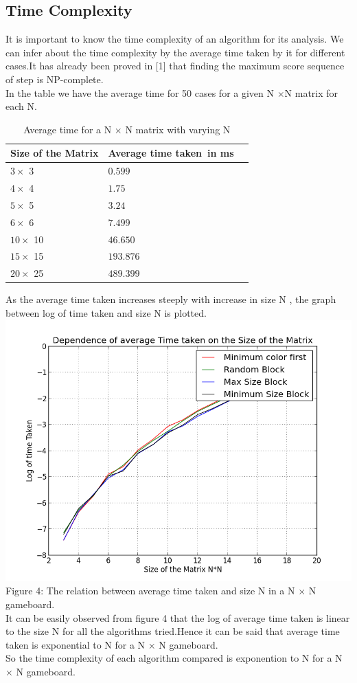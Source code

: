 \documentclass[twoside]{article}
\begin{document}
\begin{multicols}{2}
\subsection{Time Complexity}
It is important to know the time complexity of an algorithm for its analysis. We can infer about the time complexity by the average time taken by it for different cases.It has already been proved in [1] that finding the maximum score sequence of step is NP-complete.\\
In the table we have the average time for 50 cases for a given N $\times $N matrix for each N.
\begin{table}[H]
\caption{Average time for a N $\times$ N matrix with varying N}
\centering
\begin{tabular}{llr}
\toprule
\cmidrule(r){1-2}
Size of the Matrix  & Average time taken\ in ms  \\
\midrule
$3 \times$ 3 & $ 0.599$ \\
$4 \times$ 4 & $ 1.75 $ \\
$5 \times$ 5 & $ 3.24$ \\
$6 \times$ 6 & $ 7.499$ \\
$10 \times$ 10 & $ 46.650$ \\
$15 \times$ 15 & $ 193.876$ \\
$20 \times$ 25 & $ 489.399 $ \\
\bottomrule
\end{tabular}
\end{table}
As the average time taken increases steeply with increase in size N , the graph between log of time taken and size N is plotted.
\includegraphics[scale=0.4]{timesize}
{\footnotesize Figure 4: The relation between average time taken  and size N in a N $\times$ N gameboard.\\}
It can be easily observed from figure 4 that the log of average time taken is linear to the size N for all the algorithms tried.Hence it can be said that average time taken is exponential to N for a N $\times$ N  gameboard.\\
So the time complexity of each algorithm compared is exponention to N for a N $\times$ N  gameboard.


\end{multicols}
\end{document}
